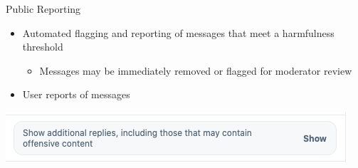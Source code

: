 \documentclass[nobackground,dvipsnames,table,aspectratio=169]{beamer}
\begin{document}
\begin{frame}{Public Reporting}
    \begin{itemize}
        \item Automated flagging and reporting of messages that meet a harmfulness threshold
        \begin{itemize}
            \item Messages may be immediately removed or flagged for moderator review
        \end{itemize}
        \item User reports of messages
    \end{itemize}
    \includegraphics[width=\textwidth]{show-offensive-content-twitter}
\end{frame}
\end{document}
